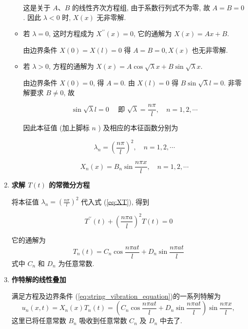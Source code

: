 \begin{enumerate}
\begin{itemize}
        这是关于 $A 、 B$ 的线性齐次方程组, 由于系数行列式不为零, 故 $A=B=0$. 因此 $\lambda<0$ 时, $X(x)$ 无非零解.

    \item 若 $\lambda=0$, 这时方程成为 $X^{\prime \prime}(x)=0$, 它的通解为 $X(x)=A x+B$.

        由边界条件 $X(0)=X(l)=0$ 得 $A=B=0, X(x)$ 也无非零解.
    
    \item 若 $\lambda>0$, 方程的通解为 $X(x)=A \cos \sqrt{\lambda} x+B \sin \sqrt{\lambda} x$.

        由边界条件 $X(0)=0$, 得 $A=0$. 由 $X(l)=0$ 得 $B \sin \sqrt{\lambda} l=0$. 非零解要求 $B \neq 0$, 故
        
        $$
        \sin \sqrt{\lambda} l=0 \quad \text { 即 } \sqrt{\lambda}=\frac{n \pi}{l}, \quad n=1,2, \cdots
        $$
        
        因此本征值 (加上脚标 $n$ ) 及相应的本征函数分别为
        
        $$
        \lambda_{n}=\left(\frac{n \pi}{l}\right)^{2}, \quad n=1,2, \cdots
        $$
        
        $$
        X_{n}(x)=B_{n} \sin \frac{n \pi x}{l}, \quad n=1,2, \cdots
        $$
\end{itemize}





  \item \textbf{求解 $T(t)$ 的常微分方程}
  
    将本征值 $\lambda_{n}=\left(\frac{n \pi}{l}\right)^{2}$ 代入式 (\ref{eq:XT}), 得到

    $$
    T^{\prime \prime}(t)+\left(\frac{n \pi a}{l}\right)^{2} T(t)=0
    $$

    它的通解为
    $$
    T_{n}(t)=C_{n} \cos \frac{n \pi a t}{l}+D_{n} \sin \frac{n \pi a t}{l}
    $$
    式中 $C_{n}$ 和 $D_{n}$ 为任意常数.
    
    \item \textbf{作特解的线性叠加}
    
    满足方程及边界条件 (\ref{eq:string_vibration_equation})的一系列特解为
    \begin{equation}
        u_{n}(x, t)=X_{n}(x) T_{n}(t)=\left(C_{n} \cos \frac{n \pi a t}{l}+D_{n} \sin \frac{n \pi a t}{l}\right) \sin \frac{n \pi x}{l}, 
        \label{eq:special_solution}
    \end{equation}
    这里已将任意常数 $B_{n}$ 吸收到任意常数 $C_{n}$ 及 $D_{n}$ 中去了.
    

\end{enumerate}
